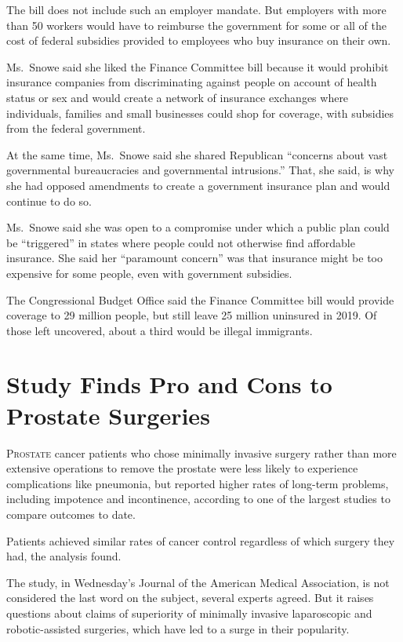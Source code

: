 ﻿\documentclass[12pt]{article}
\begin{document}
The bill does not include such an employer mandate. But employers with more than 50 workers would
have to reimburse the government for some or all of the cost of federal subsidies provided to
employees who buy insurance on their own.

Ms.~Snowe said she liked the Finance Committee bill because it would prohibit insurance companies
from discriminating against people on account of health status or sex and would create a network of
insurance exchanges where individuals, families and small businesses could shop for coverage, with
subsidies from the federal government.

At the same time, Ms.~Snowe said she shared Republican ``concerns about vast governmental
bureaucracies and governmental intrusions.'' That, she said, is why she had opposed amendments to
create a government insurance plan and would continue to do so.

Ms.~Snowe said she was open to a compromise under which a public plan could be ``triggered'' in
states where people could not otherwise find affordable insurance. She said her ``paramount
concern'' was that insurance might be too expensive for some people, even with government subsidies.

The Congressional Budget Office said the Finance Committee bill would provide coverage to 29 million
people, but still leave 25 million uninsured in 2019. Of those left uncovered, about a third would
be illegal immigrants.

\section{Study Finds Pro and Cons to Prostate Surgeries}

\lettrine{P}{rostate} cancer patients who chose minimally invasive surgery
rather than more extensive operations to remove the prostate were less likely to experience
complications like pneumonia, but reported higher rates of long-term problems, including impotence
and incontinence, according to one of the largest studies to compare outcomes to date.

Patients achieved similar rates of cancer control regardless of which surgery they had, the analysis
found.

The study, in Wednesday's Journal of the American Medical Association, is not considered the last
word on the subject, several experts agreed. But it raises questions about claims of superiority of
minimally invasive laparoscopic and robotic-assisted surgeries, which have led to a surge in their
popularity.
\end{document}
